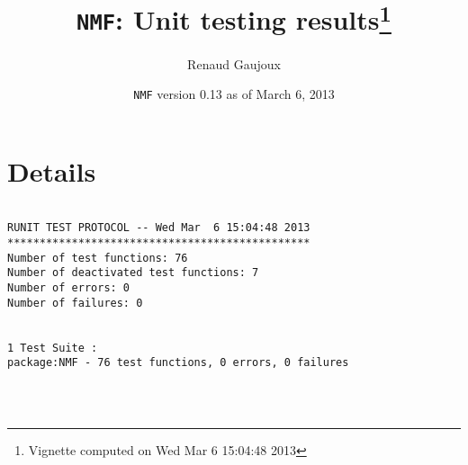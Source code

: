\documentclass[10pt]{article}
\author{Renaud Gaujoux}
\title{\texttt{NMF}: Unit testing results\footnote{Vignette computed  on Wed Mar  6 15:04:48 2013}}
\date{\texttt{NMF} version 0.13 as of March  6, 2013}
\begin{document}
\maketitle

\section{Details}
\begin{verbatim}

RUNIT TEST PROTOCOL -- Wed Mar  6 15:04:48 2013 
*********************************************** 
Number of test functions: 76 
Number of deactivated test functions: 7 
Number of errors: 0 
Number of failures: 0 

 
1 Test Suite : 
package:NMF - 76 test functions, 0 errors, 0 failures




\end{verbatim}
\end{document}
